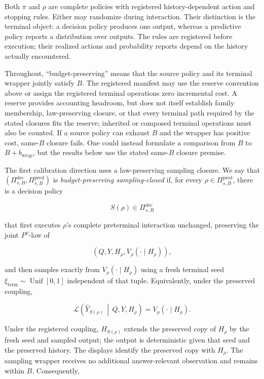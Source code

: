 \documentclass[10pt]{article} %
\providecommand{\1}{\mathbf{1}}  %
\theoremstyle{remark}
\theoremstyle{definition}
\begin{document}
Both $\pi$ and $\rho$ are complete policies with registered
history-dependent action and stopping rules. Either may randomize
during interaction. Their distinction is the terminal object: a
decision policy produces one output, whereas a predictive policy
reports a distribution over outputs. The rules are registered before
execution; their realized actions and probability reports depend on
the history actually encountered.

Throughout, ``budget-preserving'' means that the source policy and its terminal wrapper jointly satisfy $B$. The registered manifest may use the reserve convention above or assign the registered terminal operations zero incremental cost. A reserve provides accounting headroom, but does not itself establish family membership, law-preserving closure, or that every terminal path required by the stated closures fits the reserve; inherited or composed terminal operations must also be counted. If a source policy can exhaust $B$ and the wrapper has positive cost, same-$B$ closure fails. One could instead formulate a comparison from $B$ to $B+b_{\mathrm{wrap}}$, but the results below use the stated same-$B$ closure premise.

The first calibration direction uses a law-preserving sampling closure. We say that $(\Pi_{s,B}^{\mathrm{dec}},\Pi_{s,B}^{\mathrm{pred}})$ is \emph{budget-preserving sampling-closed} if, for every $\rho\in\Pi_{s,B}^{\mathrm{pred}}$, there is a decision policy

\begin{equation}
S(\rho)\in\Pi_{s,B}^{\mathrm{dec}}
\end{equation}

that first executes $\rho$'s complete preterminal interaction unchanged, preserving the joint $P^\rho$-law of

\begin{equation}
\left(
Q,Y,H_\rho,
V_\rho(\cdot\mid H_\rho)
\right),
\end{equation}

and then samples exactly from $V_\rho(\cdot\mid H_\rho)$ using a fresh terminal seed $\xi_{\mathrm{term}}\sim\operatorname{Unif}[0,1]$ independent of that tuple. Equivalently, under the preserved coupling,

\begin{equation}
\mathcal L\!\left(
\widehat Y_{S(\rho)}
\,\middle|\,
Q,Y,H_\rho
\right)
=
V_\rho(\cdot\mid H_\rho).
\end{equation}

Under the registered coupling, $H_{S(\rho)}$ extends the preserved copy of $H_\rho$ by the fresh seed and sampled output; the output is deterministic given that seed and the preserved history. The displays identify the preserved copy with $H_\rho$. The sampling wrapper receives no additional answer-relevant observation and remains within $B$. Consequently,
\end{document}
